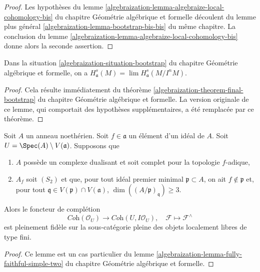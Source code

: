\begin{proof}
Les hypothèses du lemme
\ref{algebraization-lemma-algebraize-local-cohomology-bis}
du chapitre Géométrie algébrique et formelle découlent du lemme plus général
\ref{algebraization-lemma-bootstrap-bis-bis} du même chapitre.
La conclusion du lemme
\ref{algebraization-lemma-algebraize-local-cohomology-bis}
donne alors la seconde assertion.
\end{proof}

\begin{lemma}
\label{lemma-combine-one}
Dans la situation \ref{algebraization-situation-bootstrap} du chapitre
Géométrie algébrique et formelle, on a
$H^s_\mathfrak a(M) = \lim H^s_\mathfrak a(M/I^nM)$.
\end{lemma}

\begin{proof}
Cela résulte immédiatement du théorème
\ref{algebraization-theorem-final-bootstrap} du chapitre Géométrie algébrique et formelle.
La version originale de ce lemme, qui comportait des hypothèses supplémentaires,
a été remplacée par ce théorème.
\end{proof}

\begin{lemma}
\label{lemma-fully-faithful-simple-one}
Soit $A$ un anneau noethérien. Soit $f \in \mathfrak a$ un élément d'un
idéal de $A$. Soit $U = \Spec(A) \setminus V(\mathfrak a)$. Supposons que
\begin{enumerate}
\item $A$ possède un complexe dualisant et soit complet pour la topologie $f$-adique,
\item $A_f$ soit $(S_2)$ et que, pour tout idéal premier minimal
$\mathfrak p \subset A$, on ait $f \not \in \mathfrak p$ et, pour tout
$\mathfrak q \in V(\mathfrak p) \cap V(\mathfrak a)$,
$\dim((A/\mathfrak p)_\mathfrak q) \geq 3$.
\end{enumerate}
Alors le foncteur de complétion
$$
\textit{Coh}(\mathcal{O}_U)
\longrightarrow
\textit{Coh}(U, I\mathcal{O}_U),
\quad
\mathcal{F} \longmapsto \mathcal{F}^\wedge
$$
est pleinement fidèle sur la sous-catégorie pleine des objets localement libres
de type fini.
\end{lemma}

\begin{proof}
Ce lemme est un cas particulier du lemme
\ref{algebraization-lemma-fully-faithful-simple-two}
du chapitre Géométrie algébrique et formelle.
\end{proof}



